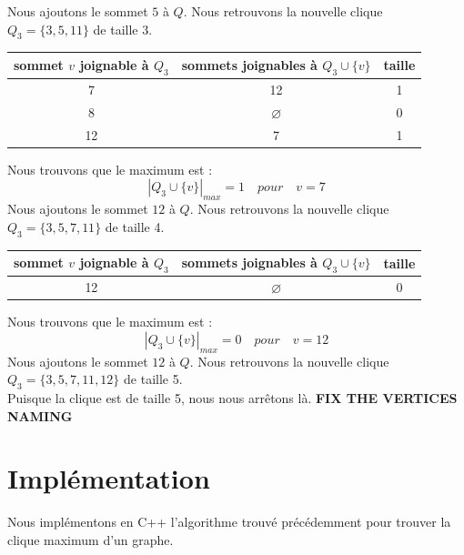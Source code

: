 \documentclass{article}
\begin{document}
Nous ajoutons le sommet $5$ à $Q$. Nous retrouvons la nouvelle clique \\
$Q_3=\{3, 5, 11\}$ de taille 3.
\begin{center}
  \begin{tabular}{|c|c|c|}
    \hline
    sommet $v$ joignable à $Q_3$ & sommets joignables à $Q_3\cup\{v\}$ & taille \\ \hline
    \hline
    7 	& 12 	            & 1 \\ \hline
    8 	& $ \varnothing$ 	& 0 \\ \hline
    12 	& 7 	            & 1 \\ \hline
  \end{tabular}
\end{center}
Nous trouvons que le maximum est :
\begin{displaymath}
  |Q_3 \cup \{v\}|_{max}=1 \quad pour \quad v=7
\end{displaymath}
Nous ajoutons le sommet $12$ à $Q$. Nous retrouvons la nouvelle clique \\
$Q_3=\{3, 5, 7, 11\}$ de taille 4.
\begin{center}
  \begin{tabular}{|c|c|c|}
    \hline
    sommet $v$ joignable à $Q_3$ & sommets joignables à $Q_3\cup\{v\}$ & taille \\ \hline
    \hline
    12    & $\varnothing$ & 0 \\ \hline
  \end{tabular}
\end{center}
Nous trouvons que le maximum est :
\begin{displaymath}
  |Q_3 \cup \{v\}|_{max}=0 \quad pour \quad v=12
\end{displaymath}
Nous ajoutons le sommet $12$ à $Q$. Nous retrouvons la nouvelle clique \\
$Q_3=\{3, 5, 7, 11, 12\}$ de taille 5.\\
Puisque la clique est de taille 5, nous nous arrêtons là.
\textbf{FIX THE VERTICES NAMING}
\section{Implémentation}
Nous implémentons en C++ l'algorithme trouvé précédemment pour trouver la clique
maximum d'un graphe.
\end{document}
